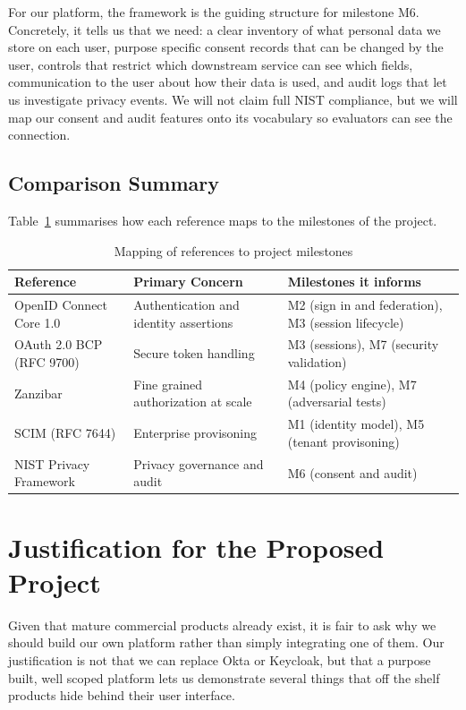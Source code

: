 \documentclass[11pt,a4paper]{article}
\begin{document}
For our platform, the framework is the guiding structure for milestone M6. Concretely, it tells us that we need: a clear inventory of what personal data we store on each user, purpose specific consent records that can be changed by the user, controls that restrict which downstream service can see which fields, communication to the user about how their data is used, and audit logs that let us investigate privacy events. We will not claim full NIST compliance, but we will map our consent and audit features onto its vocabulary so evaluators can see the connection.

\subsection{Comparison Summary}

Table~\ref{tab:refs} summarises how each reference maps to the milestones of the project.

\begin{table}[h!]
\centering
\small
\caption{Mapping of references to project milestones}
\label{tab:refs}
\begin{tabular}{p{4.2cm} p{4.2cm} p{5.4cm}}
\toprule
\textbf{Reference} & \textbf{Primary Concern} & \textbf{Milestones it informs} \\
\midrule
OpenID Connect Core 1.0 & Authentication and identity assertions & M2 (sign in and federation), M3 (session lifecycle) \\
OAuth 2.0 BCP (RFC 9700) & Secure token handling & M3 (sessions), M7 (security validation) \\
Zanzibar & Fine grained authorization at scale & M4 (policy engine), M7 (adversarial tests) \\
SCIM (RFC 7644) & Enterprise provisoning & M1 (identity model), M5 (tenant provisoning) \\
NIST Privacy Framework & Privacy governance and audit & M6 (consent and audit) \\
\bottomrule
\end{tabular}
\end{table}

\section{Justification for the Proposed Project}

Given that mature commercial products already exist, it is fair to ask why we should build our own platform rather than simply integrating one of them. Our justification is not that we can replace Okta or Keycloak, but that a purpose built, well scoped platform lets us demonstrate several things that off the shelf products hide behind their user interface.
\end{document}
